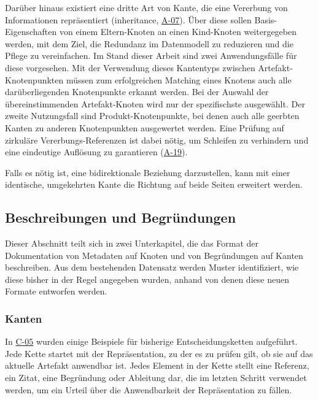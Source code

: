 Darüber hinaus existiert eine dritte Art von Kante, die eine Vererbung von Informationen repräsentiert (inheritance, \hyperref[subsec:req-selektor-inheritance]{A-07}).
Über diese sollen Basis-Eigenschaften von einem Eltern-Knoten an einen Kind-Knoten weitergegeben werden, mit dem Ziel, die Redundanz im Datenmodell zu reduzieren und die Pflege zu vereinfachen.
Im Stand dieser Arbeit sind zwei Anwendungsfälle für diese vorgesehen.
Mit der Verwendung dieses Kantentyps zwischen Artefakt-Knotenpunkten müssen zum erfolgreichen Matching eines Knotens auch alle darüberliegenden Knotenpunkte erkannt werden.
Bei der Auswahl der übereinstimmenden Artefakt-Knoten wird nur der spezifischste ausgewählt.
Der zweite Nutzungsfall sind Produkt-Knotenpunkte, bei denen auch alle geerbten Kanten zu anderen Knotenpunkten ausgewertet werden.
Eine Prüfung auf zirkuläre Vererbungs-Referenzen ist dabei nötig, um Schleifen zu verhindern und eine eindeutige Auflösung zu garantieren (\hyperref[subsec:req-graph-inner-consistency]{A-19}).

Falls es nötig ist, eine bidirektionale Beziehung darzustellen, kann mit einer identische, umgekehrten Kante die Richtung auf beide Seiten erweitert werden.

\subsection{Beschreibungen und Begründungen}\label{subsec:model-rationale}

Dieser Abschnitt teilt sich in zwei Unterkapitel, die das Format der Dokumentation von Metadaten auf Knoten und von Begründungen auf Kanten beschreiben.
Aus dem bestehenden Datensatz werden Muster identifiziert, wie diese bisher in der Regel angegeben wurden, anhand von denen diese neuen Formate entworfen werden.

\subsubsection{Kanten}

In \hyperref[subsec:c-05-reason-not-good-enough]{C-05} wurden einige Beispiele für bisherige Entscheidungsketten aufgeführt.
Jede Kette startet mit der Repräsentation, zu der es zu prüfen gilt, ob sie auf das aktuelle Artefakt anwendbar ist.
Jedes Element in der Kette stellt eine Referenz, ein Zitat, eine Begründung oder Ableitung dar, die im letzten Schritt verwendet werden, um ein Urteil über die Anwendbarkeit der Repräsentation zu fällen.


